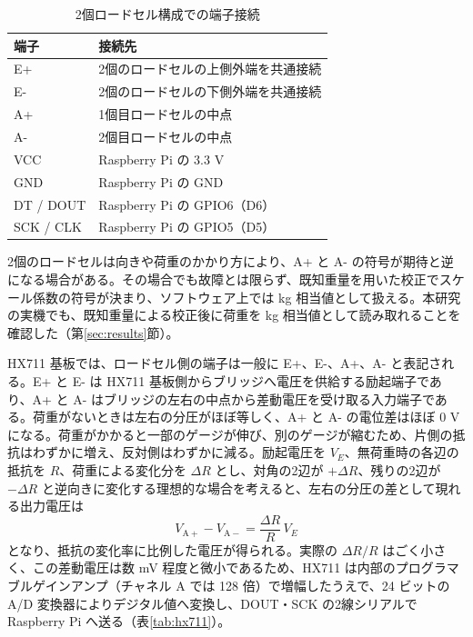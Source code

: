 \documentclass[paper=a4,fontsize=10pt,ja=standard,lualatex]{jlreq}
\begin{document}
\begin{table}[h]
\centering
\caption{2個ロードセル構成での端子接続}
\label{tab:two-cell-wiring}
\begin{tabularx}{0.95\linewidth}{lY}
\toprule
端子 & 接続先\\
\midrule
E+ & 2個のロードセルの上側外端を共通接続\\
E- & 2個のロードセルの下側外端を共通接続\\
A+ & 1個目ロードセルの中点\\
A- & 2個目ロードセルの中点\\
VCC & Raspberry Pi の 3.3 V\\
GND & Raspberry Pi の GND\\
DT / DOUT & Raspberry Pi の GPIO6（D6）\\
SCK / CLK & Raspberry Pi の GPIO5（D5）\\
\bottomrule
\end{tabularx}
\end{table}

2個のロードセルは向きや荷重のかかり方により、A+ と A- の符号が期待と逆になる場合がある。その場合でも故障とは限らず、既知重量を用いた校正でスケール係数の符号が決まり、ソフトウェア上では kg 相当値として扱える。本研究の実機でも、既知重量による校正後に荷重を kg 相当値として読み取れることを確認した（第\ref{sec:results}節）。

HX711 基板では、ロードセル側の端子は一般に E+、E-、A+、A- と表記される。E+ と E- は HX711 基板側からブリッジへ電圧を供給する励起端子であり、A+ と A- はブリッジの左右の中点から差動電圧を受け取る入力端子である。荷重がないときは左右の分圧がほぼ等しく、A+ と A- の電位差はほぼ 0 V になる。荷重がかかると一部のゲージが伸び、別のゲージが縮むため、片側の抵抗はわずかに増え、反対側はわずかに減る。励起電圧を $V_E$、無荷重時の各辺の抵抗を $R$、荷重による変化分を $\Delta R$ とし、対角の2辺が $+\Delta R$、残りの2辺が $-\Delta R$ と逆向きに変化する理想的な場合を考えると、左右の分圧の差として現れる出力電圧は
\[
  V_{\mathrm{A+}} - V_{\mathrm{A-}} = \frac{\Delta R}{R}\, V_E
\]
となり、抵抗の変化率に比例した電圧が得られる。実際の $\Delta R / R$ はごく小さく、この差動電圧は数 mV 程度と微小であるため、HX711 は内部のプログラマブルゲインアンプ（チャネル A では 128 倍）で増幅したうえで、24 ビットの A/D 変換器によりデジタル値へ変換し、DOUT・SCK の2線シリアルで Raspberry Pi へ送る（表\ref{tab:hx711}）。
\end{document}
